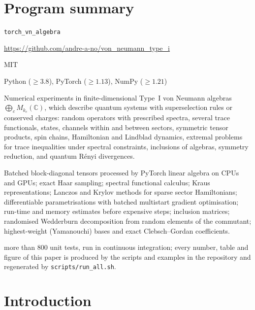 \documentclass[11pt]{article}
\newcommand{\C}{\mathbb{C}}
\begin{document}
\section*{Program summary}
\begin{description}\itemsep0pt
\item[Program title:] \texttt{torch\_vn\_algebra}
\item[Developer's repository link:] \url{https://github.com/andre-a-no/von_neumann_type_i}
\item[Licensing provisions:] MIT
\item[Programming language:] Python ($\ge3.8$), PyTorch ($\ge1.13$), NumPy ($\ge1.21$)
\item[Nature of problem:] Numerical experiments in finite-dimensional Type~I von Neumann algebras
$\bigoplus_cM_{k_c}(\C)$, which describe quantum systems with superselection rules or conserved charges:
random operators with prescribed spectra, several trace functionals, states, channels within and between
sectors, symmetric tensor products, spin chains, Hamiltonian and Lindblad dynamics, extremal problems for
trace inequalities under spectral constraints, inclusions of algebras, symmetry reduction, and quantum Rényi
divergences.
\item[Solution method:] Batched block-diagonal tensors processed by PyTorch linear algebra on CPUs and GPUs;
exact Haar sampling; spectral functional calculus; Kraus representations; Lanczos and Krylov methods for
sparse sector Hamiltonians; differentiable parametrisations with batched multistart gradient optimisation;
run-time and memory estimates before expensive steps; inclusion matrices; randomised Wedderburn decomposition
from random elements of the commutant; highest-weight (Yamanouchi) bases and exact Clebsch--Gordan coefficients.
\item[Additional comments:] more than 800 unit tests, run in continuous integration; every number, table and figure of
this paper is produced by the scripts and examples in the repository and regenerated by \texttt{scripts/run\_all.sh}.
\end{description}

\section{Introduction}\label{sec:intro}
\end{document}
